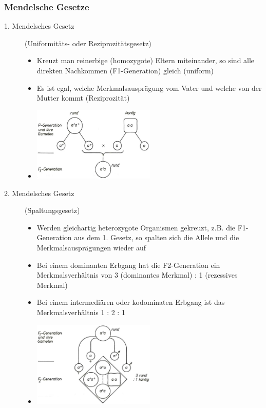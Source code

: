 \subsubsection{Mendelsche Gesetze}
\begin{description}
    \item[1. Mendelsches Gesetz] (Uniformitäts- oder Reziprozitätsgesetz)
        \begin{itemize}
            \item Kreuzt man reinerbige (homozygote) Eltern miteinander, so sind alle direkten Nachkommen (F1-Generation) gleich (uniform)
            \item Es ist egal, welche Merkmalsausprägung vom Vater und welche von der Mutter kommt (Reziprozität)
            \item[] \includegraphics[width=0.5\textwidth]{lectures/V3/pix/Mendel1.jpg}
        \end{itemize}
    \item[2. Mendelsches Gesetz] (Spaltungsgesetz)
        \begin{itemize}
            \item Werden gleichartig heterozygote Organismen gekreuzt, z.B. die F1-Generation aus dem 1. Gesetz, so spalten sich die Allele und die Merkmalsausprägungen wieder auf
            \item Bei einem dominanten Erbgang hat die F2-Generation ein Merkmalsverhältnis von 3 (dominantes Merkmal) : 1 (rezessives Merkmal)
            \item Bei einem intermediären oder kodominaten Erbgang ist das Merkmalsverhältnis 1 : 2 : 1
            \item[] \includegraphics[width=0.5\textwidth]{lectures/V3/pix/Mendel2.jpg}

\end{itemize}
\end{description}
